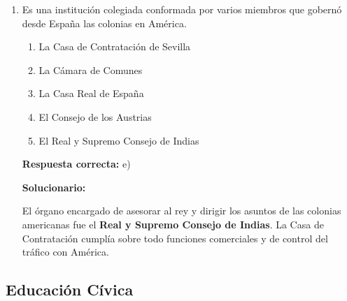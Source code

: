 \begin{enumerate}[resume]
	\vspace{2mm}
	\textbf{Solucionario:}
	
	Los \textbf{curacas} eran los jefes locales de los ayllus y actuaban como intermediarios entre la autoridad incaica y la población. Cumplían funciones administrativas, productivas y de organización del trabajo.
	
	\vspace{6mm}
	
	\item Es una institución colegiada conformada por varios miembros que gobernó desde España las colonias en América.
	\begin{enumerate}[label=\alph*)]
		\item La Casa de Contratación de Sevilla
		\item La Cámara de Comunes
		\item La Casa Real de España
		\item El Consejo de los Austrias
		\item El Real y Supremo Consejo de Indias
	\end{enumerate}
	\textbf{Respuesta correcta:} e)
	
	\vspace{2mm}
	\textbf{Solucionario:}
	
	El órgano encargado de asesorar al rey y dirigir los asuntos de las colonias americanas fue el \textbf{Real y Supremo Consejo de Indias}. La Casa de Contratación cumplía sobre todo funciones comerciales y de control del tráfico con América.
	
	\vspace{6mm}
	
\end{enumerate}

\subsection*{Educación Cívica}

